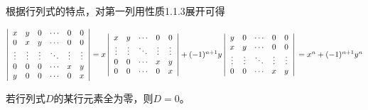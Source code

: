 \begin{solution}
    根据行列式的特点，对第一列用性质1.1.3展开可得

    $
        \left|\begin{array}{cccccc}
            x      & y      & 0      & \cdots & 0      & 0      \\
            0      & x      & y      & \cdots & 0      & 0      \\
            \vdots & \vdots & \vdots & \ddots & \vdots & \vdots \\
            0      & 0      & 0      & \cdots & x      & y      \\
            y      & 0      & 0      & \cdots & 0      & x
        \end{array}\right| =
        x\left|\begin{array}{cccccc}
            x      & y      & \cdots & 0      & 0      \\
            \vdots & \vdots & \ddots & \vdots & \vdots \\
            0      & 0      & \cdots & x      & y      \\
            0      & 0      & \cdots & 0      & x
        \end{array}\right|+(-1)^{n+1}y
        \left|\begin{array}{cccccc}
            y      & 0      & \cdots & 0      & 0      \\
            x      & y      & \cdots & 0      & 0      \\
            \vdots & \vdots & \ddots & \vdots & \vdots \\
            0      & 0      & \cdots & x      & y
        \end{array}\right|\\
        =x^{n}+(-1)^{n+1}y^{n}
    $
\end{solution}

\begin{tuilun}
    若行列式$D$的某行元素全为零，则$D=0$。
\end{tuilun}

